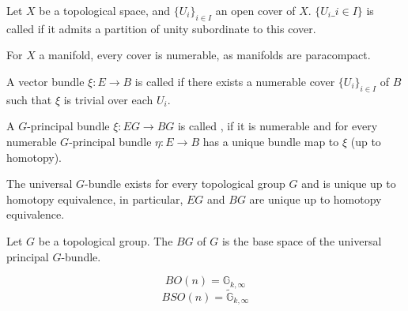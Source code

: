 \documentclass[a4paper,11pt]{article}
\begin{document}
\begin{definition}
    Let \(X\) be a topological space, and \(\{U_i \}_{i\in I}\) an open cover of \(X\). \(\{U_i\_{i\in I}\}\) is called  if it admits a partition of unity subordinate to this cover.
\end{definition}

\begin{remark}
    For \(X\) a manifold, every cover is numerable, as manifolds are paracompact.
\end{remark}

\begin{definition}
    A vector bundle \(\xi:E\to B\) is called  if there exists a numerable cover \(\{U_i \}_{i\in I}\) of \(B\) such that \(\xi\) is trivial over each \(U_i\).
\end{definition}

\begin{definition}
    A \(G\)-principal bundle \(\xi:EG\to BG\) is called , if it is numerable and for every numerable \(G\)-principal bundle \(\eta:E\to B\) has a unique bundle map to \(\xi\) (up to homotopy).
\end{definition}

\begin{remark}
    The universal \(G\)-bundle exists for every topological group \(G\) and is unique up to homotopy equivalence, in particular, \(EG\) and \(BG\) are unique up to homotopy equivalence.
\end{remark}

\begin{definition}
    Let \(G\) be a topological group. The  \(BG\) of \(G\) is the base space of the universal principal \(G\)-bundle.
\end{definition}

\begin{observation}
    \[BO(n)=\mathbb{G}_{k,\infty}\]
    \[BSO(n)=\widetilde{\mathbb{G}}_{k,\infty}\]
\end{observation}
\end{document}
